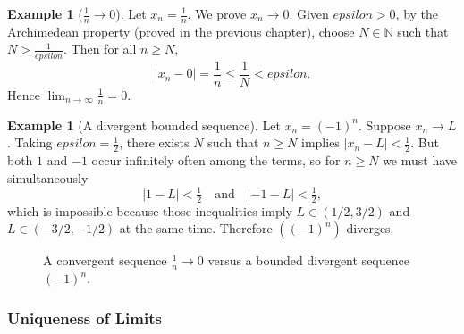 \documentclass[12pt]{article}
\numberwithin{equation}{section}
\def\abs#1{|#1|}
\def\eps{epsilon}
\newcommand{\NN}{\mathbb{N}}
\DeclarePairedDelimiter{\abs}{\lvert}{\rvert}
\newcommand{\eps}{\varepsilon}               %
\theoremstyle{plain}
\theoremstyle{definition}
\newtheorem{example}[theorem]{Example}
\theoremstyle{remark}
\begin{document}
\begin{example}[$\frac1n\to 0$]\label{ex:1n-to-0}
Let $x_n=\frac{1}{n}$. We prove $x_n\to 0$.
Given $\eps>0$, by the Archimedean property (proved in the previous chapter), choose $N\in\NN$ such that $N>\frac{1}{\eps}$.
Then for all $n\ge N$,
\[
\abs{x_n-0}=\frac{1}{n}\le \frac{1}{N}<\eps.
\]
Hence $\lim_{n\to\infty}\frac{1}{n}=0$.
\end{example}

\begin{example}[A divergent bounded sequence]
Let $x_n=(-1)^n$. Suppose $x_n\to L$. Taking $\eps=\tfrac12$, there exists $N$ such that $n\ge N$ implies $\abs{x_n-L}<\tfrac12$.
But both $1$ and $-1$ occur infinitely often among the terms, so for $n\ge N$ we must have simultaneously
\[
\abs{1-L}<\tfrac12\quad \text{and}\quad \abs{-1-L}<\tfrac12,
\]
which is impossible because those inequalities imply $L\in(1/2,3/2)$ and $L\in(-3/2,-1/2)$ at the same time.
Therefore $( (-1)^n )$ diverges.
\end{example}

\begin{figure}[H]
\centering
{}
\caption{A convergent sequence $\frac{1}{n}\to 0$ versus a bounded divergent sequence $(-1)^n$.}
\end{figure}

\subsubsection{Uniqueness of Limits}
\end{document}

